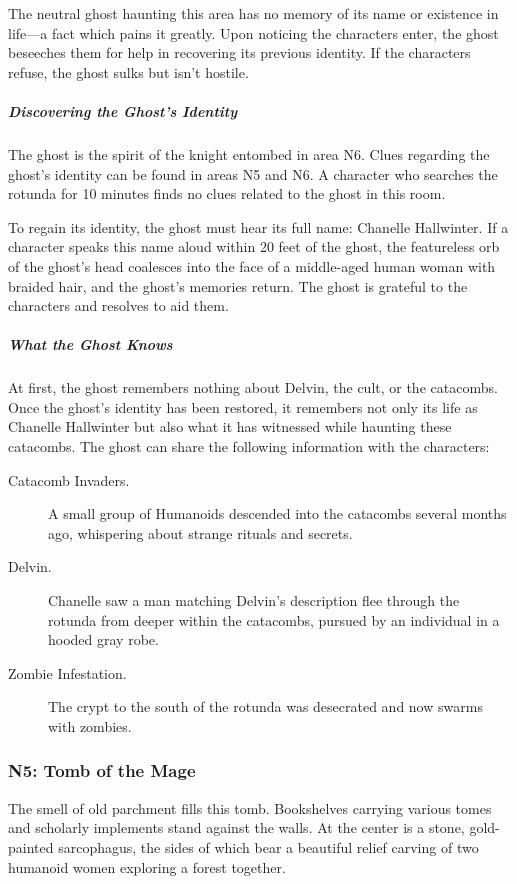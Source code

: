 \documentclass[10pt,a4paper,twoside,bg=print,twocolumn,openany,nodeprecatedcode]{dndbook}
\begin{document}
The neutral ghost haunting this area has no memory of its name or existence in life—a fact which pains it greatly. Upon noticing the characters enter, the ghost beseeches them for help in recovering its previous identity. If the characters refuse, the ghost sulks but isn't hostile.
\subparagraph{Discovering the Ghost's Identity}
The ghost is the spirit of the knight entombed in area N6. Clues regarding the ghost's identity can be found in areas N5 and N6. A character who searches the rotunda for 10 minutes finds no clues related to the ghost in this room.

To regain its identity, the ghost must hear its full name: Chanelle Hallwinter. If a character speaks this name aloud within 20 feet of the ghost, the featureless orb of the ghost's head coalesces into the face of a middle-aged human woman with braided hair, and the ghost's memories return. The ghost is grateful to the characters and resolves to aid them.
\subparagraph{What the Ghost Knows}

At first, the ghost remembers nothing about Delvin, the cult, or the catacombs. Once the ghost's identity has been restored, it remembers not only its life as Chanelle Hallwinter but also what it has witnessed while haunting these catacombs. The ghost can share the following information with the characters:

\begin{description}
\item[Catacomb Invaders.]
A small group of Humanoids descended into the catacombs several months ago, whispering about strange rituals and secrets.
\item[Delvin.]
Chanelle saw a man matching Delvin's description flee through the rotunda from deeper within the catacombs, pursued by an individual in a hooded gray robe.
\item[Zombie Infestation.]
The crypt to the south of the rotunda was desecrated and now swarms with zombies.
\end{description}

\subsubsection{N5: Tomb of the Mage}
\begin{DndReadAloud}{}
The smell of old parchment fills this tomb. Bookshelves carrying various tomes and scholarly implements stand against the walls. At the center is a stone, gold-painted sarcophagus, the sides of which bear a beautiful relief carving of two humanoid women exploring a forest together.
\end{DndReadAloud}
\end{document}
